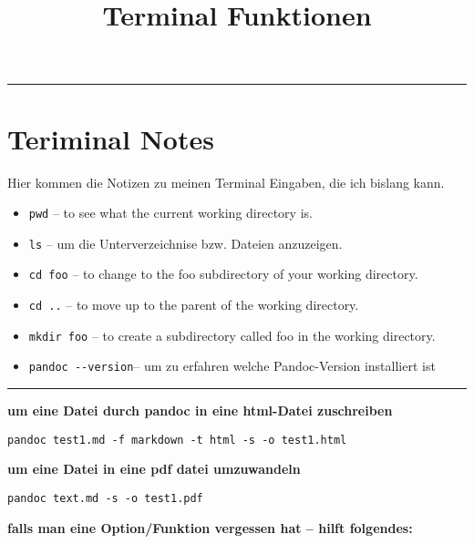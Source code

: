 \documentclass[]{article}
\title{Terminal Funktionen}
\author{}
\date{}
\begin{document}
\maketitle


{
\hypersetup{linkcolor=black}
\setcounter{tocdepth}{2}
\tableofcontents
}
\begin{center}\rule{0.5\linewidth}{\linethickness}\end{center}

\section{Teriminal Notes}\label{teriminal-notes}

Hier kommen die Notizen zu meinen Terminal Eingaben, die ich bislang
kann.

\begin{itemize}
\itemsep1pt\parskip0pt
\item
  \texttt{pwd} -- to see what the current working directory is.
\item
  \texttt{ls} -- um die Unterverzeichnise bzw. Dateien anzuzeigen.
\item
  \texttt{cd foo} -- to change to the foo subdirectory of your working
  directory.
\item
  \texttt{cd ..} -- to move up to the parent of the working directory.
\item
  \texttt{mkdir foo} -- to create a subdirectory called foo in the
  working directory.
\item
  \texttt{pandoc -\/-version}-- um zu erfahren welche Pandoc-Version
  installiert ist
\end{itemize}

\begin{center}\rule{0.5\linewidth}{\linethickness}\end{center}

\textbf{um eine Datei durch pandoc in eine html-Datei zuschreiben}

\begin{verbatim}
pandoc test1.md -f markdown -t html -s -o test1.html
\end{verbatim}

\textbf{um eine Datei in eine pdf datei umzuwandeln}

\begin{verbatim}
pandoc text.md -s -o test1.pdf
\end{verbatim}

\textbf{falls man eine Option/Funktion vergessen hat -- hilft
folgendes:}
\end{document}
